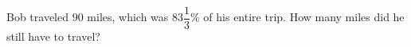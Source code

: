 Bob traveled $90$ miles, which was $83\dfrac{1}{3}\%$ of his entire trip. How many miles did he still have to travel?
